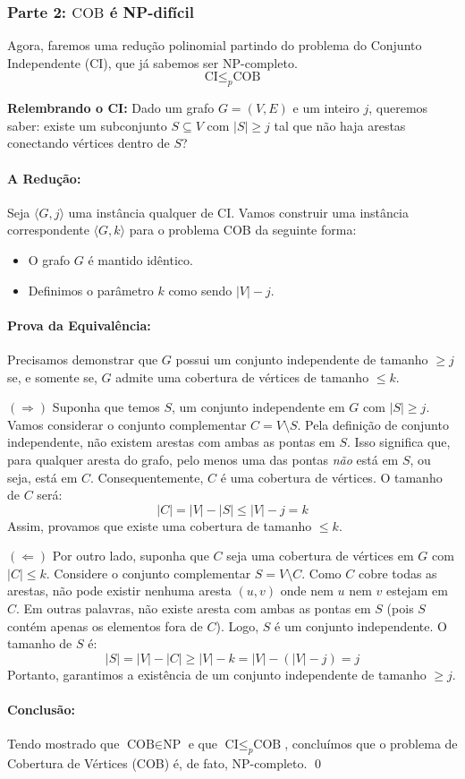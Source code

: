 \documentclass[a4paper,12pt]{article}
\begin{document}
\subsubsection*{Parte 2: $\text{COB}$ é NP-difícil}

Agora, faremos uma redução polinomial partindo do problema do Conjunto Independente (CI), que já sabemos ser NP-completo.
$$ \text{CI} \leq_p \text{COB} $$

\noindent\textbf{Relembrando o CI:} Dado um grafo $G=(V,E)$ e um inteiro $j$, queremos saber: existe um subconjunto $S \subseteq V$ com $|S| \ge j$ tal que não haja arestas conectando vértices dentro de $S$?

\paragraph{A Redução:}
Seja $\langle G, j \rangle$ uma instância qualquer de CI. Vamos construir uma instância correspondente $\langle G, k \rangle$ para o problema COB da seguinte forma:
\begin{itemize}
    \item O grafo $G$ é mantido idêntico.
    \item Definimos o parâmetro $k$ como sendo $|V| - j$.
\end{itemize}

\paragraph{Prova da Equivalência:}
Precisamos demonstrar que $G$ possui um conjunto independente de tamanho $\ge j$ se, e somente se, $G$ admite uma cobertura de vértices de tamanho $\le k$.

\noindent $(\Rightarrow)$ Suponha que temos $S$, um conjunto independente em $G$ com $|S| \ge j$.
Vamos considerar o conjunto complementar $C = V \setminus S$.
Pela definição de conjunto independente, não existem arestas com ambas as pontas em $S$. Isso significa que, para qualquer aresta do grafo, pelo menos uma das pontas \textit{não} está em $S$, ou seja, está em $C$. Consequentemente, $C$ é uma cobertura de vértices.
O tamanho de $C$ será:
$$ |C| = |V| - |S| \le |V| - j = k $$
Assim, provamos que existe uma cobertura de tamanho $\le k$.

\noindent $(\Leftarrow)$ Por outro lado, suponha que $C$ seja uma cobertura de vértices em $G$ com $|C| \le k$.
Considere o conjunto complementar $S = V \setminus C$.
Como $C$ cobre todas as arestas, não pode existir nenhuma aresta $(u, v)$ onde nem $u$ nem $v$ estejam em $C$. Em outras palavras, não existe aresta com ambas as pontas em $S$ (pois $S$ contém apenas os elementos fora de $C$). Logo, $S$ é um conjunto independente.
O tamanho de $S$ é:
$$ |S| = |V| - |C| \ge |V| - k = |V| - (|V| - j) = j $$
Portanto, garantimos a existência de um conjunto independente de tamanho $\ge j$.

\paragraph{Conclusão:}
Tendo mostrado que $\text{COB} \in \text{NP}$ e que $\text{CI} \leq_p \text{COB}$, concluímos que o problema de Cobertura de Vértices (COB) é, de fato, NP-completo. \qed
\end{document}
